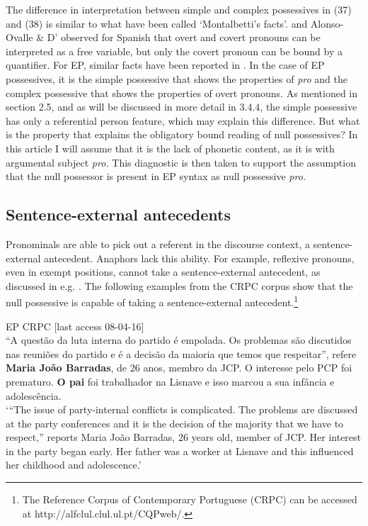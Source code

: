\documentclass[output=paper]{langsci/langscibook}
\begin{document}
The difference in interpretation between simple and complex possessives in (37) and (38) is similar to what have been called ‘Montalbetti’s facts’. \citet{Montalbetti1984} and Alonso-Ovalle \& D’\citet{Introno2001} observed for Spanish that overt and covert pronouns can be interpreted as a free variable, but only the covert pronoun can be bound by a quantifier. For EP, similar facts have been reported in \citet{Lobo2013}. In the case of EP possessives, it is the simple possessive that shows the properties of \textit{pro} and the complex possessive that shows the properties of overt pronouns. As mentioned in section 2.5, and as will be discussed in more detail in 3.4.4, the simple possessive has only a referential person feature, which may explain this difference. But what is the property that explains the obligatory bound reading of null possessives? In this article I will assume that it is the lack of phonetic content, as it is with argumental subject \textit{pro.} This diagnostic is then taken to support the assumption that the null possessor is present in EP syntax as null possessive \textit{pro.}

\subsection{Sentence-external antecedents}%

Pronominals are able to pick out a referent in the discourse context, a sentence-external antecedent. Anaphors lack this ability. For example, reflexive pronouns, even in exempt positions, cannot take a sentence-external antecedent, as discussed in e.g. \citet{Campos1995}. The following examples from the CRPC corpus show that the null possessive is capable of taking a sentence-external antecedent.\footnote{The Reference Corpus of Contemporary Portuguese (CRPC) can be accessed at http://alfclul.clul.ul.pt/CQPweb/.}

\ea%
    EP   CRPC [last access 08-04-16]\label{ex:wein:40}\\
    “A questão da luta interna do partido é empolada. Os problemas são discutidos nas reuniões do partido e é a decisão da maioria que temos que respeitar”, refere \textbf{Maria João Barradas}, de 26 anos, membro da JCP. O interesse pelo PCP foi prematuro. \textbf{O pai} foi trabalhador na Lisnave e isso marcou a sua infância e adolescência.\\
    \glt ‘“The issue of party-internal conflicts is complicated. The problems are discussed at the party conferences and it is the decision of the majority that we have to respect,” reports Maria João Barradas, 26 years old, member of JCP. Her interest in the party began early. Her father was a worker at Lisnave and this influenced her childhood and adolescence.’
\z
\end{document}

